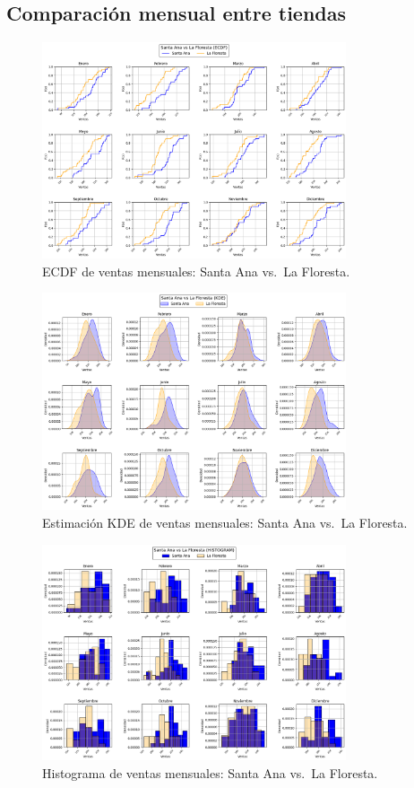 \documentclass[12pt,a4paper]{article}
\begin{document}
\subsection{Comparación mensual entre tiendas}
\begin{figure}[H]
  \centering
  \includegraphics[width=0.8\textwidth]{graphs/SantaAna_vs_LaFloresta_Mensual_ecdf_comparison.png}
  \caption{ECDF de ventas mensuales: Santa Ana vs.\ La Floresta.}
\end{figure}
\begin{figure}[H]
  \centering
  \includegraphics[width=0.8\textwidth]{graphs/SantaAna_vs_LaFloresta_Mensual_kde_comparison.png}
  \caption{Estimación KDE de ventas mensuales: Santa Ana vs.\ La Floresta.}
\end{figure}
\begin{figure}[H]
  \centering
  \includegraphics[width=0.8\textwidth]{graphs/SantaAna_vs_LaFloresta_Mensual_histogram_comparison.png}
  \caption{Histograma de ventas mensuales: Santa Ana vs.\ La Floresta.}
\end{figure}
\end{document}
